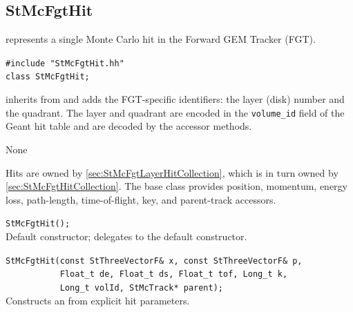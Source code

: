 \clearpage
%
%
\subsection{StMcFgtHit}
 
\label{sec:StMcFgtHit}
\begin{Entry}
\item[Summary]
     represents a single Monte Carlo hit in the
    Forward GEM Tracker (FGT).

\item[Synopsis]
    \verb+#include "StMcFgtHit.hh"+\\
    \verb+class StMcFgtHit;+\\

\item[Description]
     inherits from  and adds the
    FGT-specific identifiers: the layer (disk) number and the
    quadrant.  The layer and quadrant are encoded in the
    \verb+volume_id+ field of the Geant hit table and are decoded
    by the accessor methods.

\item[Persistence]
    None

\item[Related Classes]
    Hits are owned by 
    \ref{sec:StMcFgtLayerHitCollection}, which is in turn owned by
     \ref{sec:StMcFgtHitCollection}.
    The base class  provides position, momentum,
    energy loss, path-length, time-of-flight, key, and parent-track
    accessors.

\item[Public\\ Constructors]
    \verb+StMcFgtHit();+\\
    Default constructor; delegates to the  default constructor.

    \verb+StMcFgtHit(const StThreeVectorF& x, const StThreeVectorF& p,+\\
    \verb+           Float_t de, Float_t ds, Float_t tof, Long_t k,+\\
    \verb+           Long_t volId, StMcTrack* parent);+\\
    Constructs an  from explicit hit parameters.


\end{Entry}
